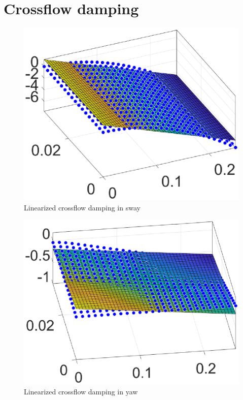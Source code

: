\documentclass[12pt,a4]{article}
\begin{document}
\section{Crossflow damping}



\begin{figure}[H]
	\includegraphics{graphics/SwayDampingLinearized.eps}
	\caption{Linearized crossflow damping in sway}
	\label{fig:SwayDampingLinearized}
\end{figure}
\begin{figure}[H]
	\includegraphics{graphics/YawDampingLinearized.eps}
	\caption{Linearized crossflow damping in yaw}
	\label{fig:YawDampingLinearized}
\end{figure}
\end{document}
